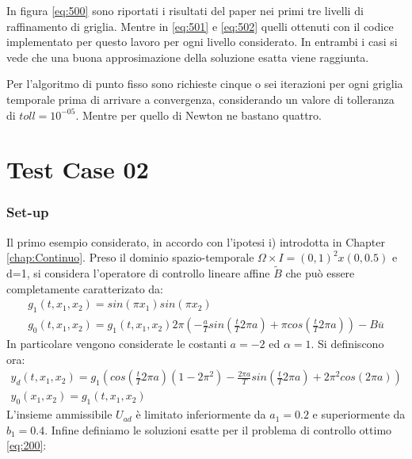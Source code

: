 In figura \ref{eq:500} sono riportati i risultati del paper \cite{MAIN} nei primi tre livelli di raffinamento di griglia. Mentre in \ref{eq:501} e \ref{eq:502} quelli ottenuti con il codice implementato per questo lavoro per ogni livello considerato. In entrambi i casi si vede che una buona approsimazione della soluzione esatta viene raggiunta.
\par
Per l'algoritmo di punto fisso sono richieste cinque o sei iterazioni per ogni griglia temporale prima di arrivare a convergenza, considerando un valore di tolleranza di $toll=10^{-05}$. Mentre per quello di Newton ne bastano quattro. 

\section{Test Case 02}
\subsubsection{Set-up}
Il primo esempio considerato, in accordo con l'ipotesi i) introdotta in Chapter \ref{chap:Continuo}.
Preso il dominio spazio-temporale $\Omega \times I = (0,1)^2 x(0,0.5)$ e d=1, si considera l'operatore di controllo lineare affine $\tilde{B}$ che può essere completamente caratterizato da:
{\renewcommand\arraystretch{2}
\begin{equation}
\begin{array}{c}
g_1(t,x_1,x_2) = sin({\pi}x_1)sin({\pi}x_2)\\
g_0(t,x_1,x_2) = g_1(t,x_1,x_2) 2\pi \left( -\frac{a}{T}sin\left( \frac{t}{T}2{\pi}a \right) + \pi cos\left( \frac{t}{T}2{\pi}a \right) \right) - B\overline{u}
\end{array}
\label{eq:505}
\end{equation}
}
In particolare vengono considerate le costanti $a=-2$ ed $\alpha=1$.
Si definiscono ora:
{\renewcommand\arraystretch{2}
\begin{equation}
\begin{array}{c}
y_d(t,x_1,x_2) = g_1\left( cos\left( \frac{t}{T}2{\pi}a \right)(1-2{\pi}^2) -\frac{2{\pi}a}{T}sin\left( \frac{t}{T}2{\pi}a \right) +2{\pi}^2cos(2{\pi}a) \right)\\
y_0(x_1,x_2) = g_1(t,x_1,x_2)
\end{array}
\label{eq:506}
\end{equation}
}
L'insieme ammissibile $U_{ad}$ è limitato inferiormente da $a_1=0.2$ e superiormente da $b_1=0.4$.
Infine definiamo le soluzioni esatte per il problema di controllo ottimo \ref{eq:200}:
